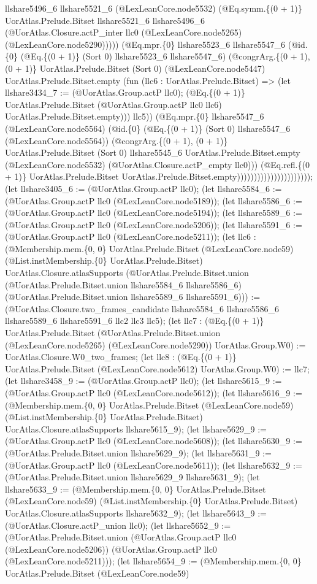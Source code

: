 \documentclass[11pt]{article}
\begin{document}
llshare5496\_6 llshare5521\_6 (@LexLeanCore.node5532) (@Eq.symm.\{(0 + 1)\} UorAtlas.Prelude.Bitset llshare5521\_6 llshare5496\_6 (@UorAtlas.Closure.actP\_inter llc0 (@LexLeanCore.node5265) (@LexLeanCore.node5290))))) (@Eq.mpr.\{0\} llshare5523\_6 llshare5547\_6 (@id.\{0\} (@Eq.\{(0 + 1)\} (Sort 0) llshare5523\_6 llshare5547\_6) (@congrArg.\{(0 + 1), (0 + 1)\} UorAtlas.Prelude.Bitset (Sort 0) (@LexLeanCore.node5447) UorAtlas.Prelude.Bitset.empty (fun (llc6 : UorAtlas.Prelude.Bitset) => (let llshare3434\_7 := (@UorAtlas.Group.actP llc0); (@Eq.\{(0 + 1)\} UorAtlas.Prelude.Bitset (@UorAtlas.Group.actP llc0 llc6) UorAtlas.Prelude.Bitset.empty))) llc5)) (@Eq.mpr.\{0\} llshare5547\_6 (@LexLeanCore.node5564) (@id.\{0\} (@Eq.\{(0 + 1)\} (Sort 0) llshare5547\_6 (@LexLeanCore.node5564)) (@congrArg.\{(0 + 1), (0 + 1)\} UorAtlas.Prelude.Bitset (Sort 0) llshare5545\_6 UorAtlas.Prelude.Bitset.empty (@LexLeanCore.node5532) (@UorAtlas.Closure.actP\_empty llc0))) (@Eq.refl.\{(0 + 1)\} UorAtlas.Prelude.Bitset UorAtlas.Prelude.Bitset.empty)))))))))))))))))))))); (let llshare3405\_6 := (@UorAtlas.Group.actP llc0); (let llshare5584\_6 := (@UorAtlas.Group.actP llc0 (@LexLeanCore.node5189)); (let llshare5586\_6 := (@UorAtlas.Group.actP llc0 (@LexLeanCore.node5194)); (let llshare5589\_6 := (@UorAtlas.Group.actP llc0 (@LexLeanCore.node5206)); (let llshare5591\_6 := (@UorAtlas.Group.actP llc0 (@LexLeanCore.node5211)); (let llc6 : (@Membership.mem.\{0, 0\} UorAtlas.Prelude.Bitset (@LexLeanCore.node59) (@List.instMembership.\{0\} UorAtlas.Prelude.Bitset) UorAtlas.Closure.atlasSupports (@UorAtlas.Prelude.Bitset.union (@UorAtlas.Prelude.Bitset.union llshare5584\_6 llshare5586\_6) (@UorAtlas.Prelude.Bitset.union llshare5589\_6 llshare5591\_6))) := (@UorAtlas.Closure.two\_frames\_candidate llshare5584\_6 llshare5586\_6 llshare5589\_6 llshare5591\_6 llc2 llc3 llc5); (let llc7 : (@Eq.\{(0 + 1)\} UorAtlas.Prelude.Bitset (@UorAtlas.Prelude.Bitset.union (@LexLeanCore.node5265) (@LexLeanCore.node5290)) UorAtlas.Group.W0) := UorAtlas.Closure.W0\_two\_frames; (let llc8 : (@Eq.\{(0 + 1)\} UorAtlas.Prelude.Bitset (@LexLeanCore.node5612) UorAtlas.Group.W0) := llc7; (let llshare3458\_9 := (@UorAtlas.Group.actP llc0); (let llshare5615\_9 := (@UorAtlas.Group.actP llc0 (@LexLeanCore.node5612)); (let llshare5616\_9 := (@Membership.mem.\{0, 0\} UorAtlas.Prelude.Bitset (@LexLeanCore.node59) (@List.instMembership.\{0\} UorAtlas.Prelude.Bitset) UorAtlas.Closure.atlasSupports llshare5615\_9); (let llshare5629\_9 := (@UorAtlas.Group.actP llc0 (@LexLeanCore.node5608)); (let llshare5630\_9 := (@UorAtlas.Prelude.Bitset.union llshare5629\_9); (let llshare5631\_9 := (@UorAtlas.Group.actP llc0 (@LexLeanCore.node5611)); (let llshare5632\_9 := (@UorAtlas.Prelude.Bitset.union llshare5629\_9 llshare5631\_9); (let llshare5633\_9 := (@Membership.mem.\{0, 0\} UorAtlas.Prelude.Bitset (@LexLeanCore.node59) (@List.instMembership.\{0\} UorAtlas.Prelude.Bitset) UorAtlas.Closure.atlasSupports llshare5632\_9); (let llshare5643\_9 := (@UorAtlas.Closure.actP\_union llc0); (let llshare5652\_9 := (@UorAtlas.Prelude.Bitset.union (@UorAtlas.Group.actP llc0 (@LexLeanCore.node5206)) (@UorAtlas.Group.actP llc0 (@LexLeanCore.node5211))); (let llshare5654\_9 := (@Membership.mem.\{0, 0\} UorAtlas.Prelude.Bitset (@LexLeanCore.node59) 
\end{document}
